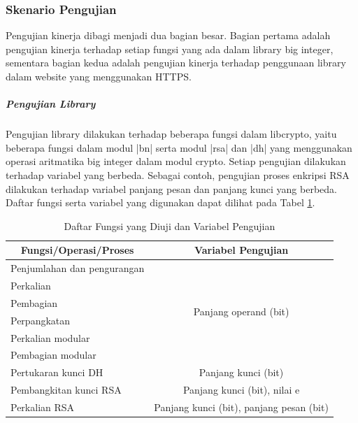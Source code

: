    \subsubsection{Skenario Pengujian}
      Pengujian kinerja dibagi menjadi dua bagian besar. Bagian pertama adalah pengujian kinerja terhadap setiap fungsi yang ada dalam library big integer, sementara bagian kedua adalah pengujian kinerja terhadap penggunaan library dalam website yang menggunakan HTTPS.

      \subparagraph{Pengujian Library}
      Pengujian library dilakukan terhadap beberapa fungsi dalam libcrypto, yaitu beberapa fungsi dalam modul |bn| serta modul |rsa| dan |dh| yang menggunakan operasi aritmatika big integer dalam modul crypto. Setiap pengujian dilakukan terhadap variabel yang berbeda. Sebagai contoh, pengujian proses enkripsi RSA dilakukan terhadap variabel panjang pesan dan panjang kunci yang berbeda. Daftar fungsi serta variabel yang digunakan dapat dilihat pada Tabel \ref{tab:lib_testing}.

      \begin{table}[]
        \centering
        \caption{Daftar Fungsi yang Diuji dan Variabel Pengujian}
        \label{tab:lib_testing}
        \begin{tabular}{l c}
          \toprule
          \multicolumn{1}{c}{\textbf{Fungsi/Operasi/Proses}} & \textbf{Variabel Pengujian} \\ \midrule
Penjumlahan dan pengurangan & \multirow{6}{*}{Panjang operand (bit)}          \\
Perkalian                   &                                                 \\
Pembagian                   &                                                 \\
Perpangkatan                &                                                 \\
Perkalian modular           &                                                 \\
Pembagian modular           &                                                 \\
Pertukaran kunci DH          & Panjang kunci (bit)                             \\
Pembangkitan kunci RSA       & Panjang kunci (bit), nilai e                    \\
Perkalian RSA                & Panjang kunci (bit), panjang pesan (bit)        \\ \bottomrule
        \end{tabular}
      \end{table}

